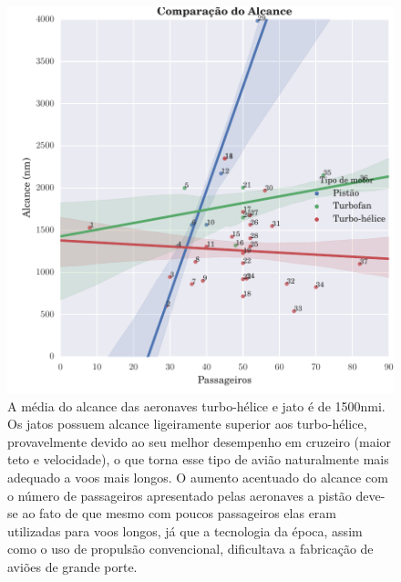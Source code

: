 \begin{figure}
\centering
\includegraphics{../autogenerated/graficos_comparativos/alcance.pdf}
\caption[Comparação do alcance]{A média do alcance das aeronaves turbo-hélice e jato é de 1500\si{nmi}.
Os jatos possuem alcance ligeiramente superior aos turbo-hélice, provavelmente devido ao seu melhor desempenho em cruzeiro (maior teto e velocidade), o que torna esse tipo de avião naturalmente mais adequado a voos mais longos.
O aumento acentuado do alcance com o número de passageiros apresentado pelas aeronaves a pistão deve-se ao fato de que mesmo com poucos passageiros elas eram utilizadas para voos longos, já que a tecnologia da época, assim como o uso de propulsão convencional, dificultava a fabricação de aviões de grande porte.}
\label{fig:alcance}
\end{figure}

